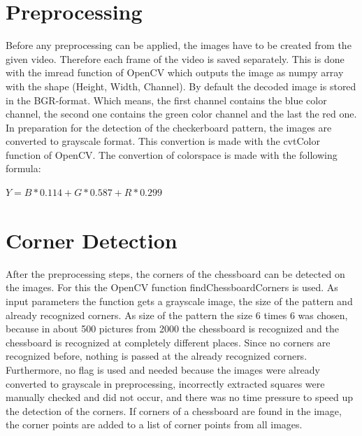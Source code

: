 \documentclass[twocolumn,10pt]{asme2ej}
\begin{document}
\section{Preprocessing}
\label{section:preprocessing}
\noindent
Before any preprocessing can be applied, the images have to be created from the given video. Therefore each frame of the video is saved separately. This is done with the imread function\cite{opencv_imread} of OpenCV which 
outputs the image as numpy array with the shape (Height, Width, Channel). By default the decoded image is stored in the BGR-format. Which means, the first channel contains the
blue color channel, the second one contains the green color channel and the last the red one. In preparation for the detection of the checkerboard pattern, the images are converted to grayscale format. 
This convertion is made with the cvtColor function\cite{opencv_cvtColor} of OpenCV. The convertion of colorspace is made with the following
formula\cite{opencv_rgb2gray}:
\begin{center}
    $Y = B * 0.114 + G * 0.587 + R * 0.299$
    \label{eq_rgb2gray}
\end{center}




\section{Corner Detection}
\label{section:cornerdetection}

\noindent
After the preprocessing steps, the corners of the chessboard can be detected on the images. For this the OpenCV function findChessboardCorners\cite{opencv_findChessboardCorners} is used. As input parameters the function gets a grayscale image, the size of the pattern and already recognized corners. As size of the pattern the size 6 times 6 was chosen, because in about 500 pictures from 2000 the chessboard is recognized and the chessboard is recognized at completely different places. Since no corners are recognized before, nothing is passed at the already recognized corners. Furthermore, no flag is used and needed because the images were already converted to grayscale in preprocessing, incorrectly extracted squares were manually checked and did not occur, and there was no time pressure to speed up the detection of the corners.
If corners of a chessboard are found in the image, the corner points are added to a list of corner points from all images.
\end{document}
